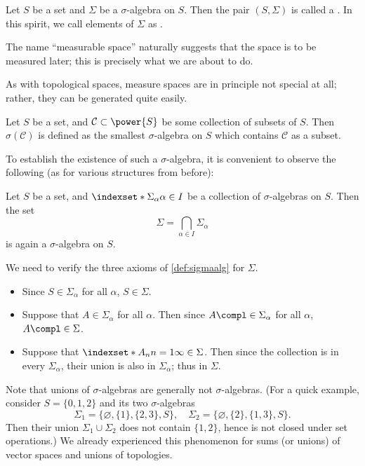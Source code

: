 \begin{definition}
    \label{def:mblspace}
    Let \(S\) be a set
    and \(\Sigma\) be a \(\sigma\)-algebra on \(S\).
    Then the pair \((S,\Sigma)\) is called
    a .
    In this spirit,
    we call elements of \(\Sigma\) as
    .
\end{definition}

The name ``measurable space'' naturally suggests that
the space is to be measured later;
this is precisely what we are about to do.

As with topological spaces,
measure spaces are in principle not special at all;
rather, they can be generated quite easily.

\begin{definition}
    \label{def:gensigmaalg}
    Let \(S\) be a set,
    and \(\mathcal C\subset\power{S}\) be some collection
    of subsets of \(S\).
    Then \(\sigma(\mathcal C)\) is defined as
    the smallest \(\sigma\)-algebra on \(S\)
    which contains \(\mathcal C\) as a subset.
\end{definition}

To establish the existence of such a \(\sigma\)-algebra,
it is convenient to observe the following
(as for various structures from before):
\begin{proposition}
    \label{prop:intersectsigma}
    Let \(S\) be a set,
    and \(\indexset*{\Sigma_\alpha}{\alpha\in I}{}\)
    be a collection of \(\sigma\)-algebras on \(S\).
    Then the set
    \[
        \Sigma
        =\bigcap_{\alpha\in I}\Sigma_\alpha
    \]
    is again a \(\sigma\)-algebra on \(S\).
\end{proposition}
\begin{myproof}
    We need to verify the three axioms of \cref{def:sigmaalg}
    for \(\Sigma\).
    \begin{itemize}
        \item Since \(S\in\Sigma_\alpha\) for all \(\alpha\),
        \(S\in\Sigma\).

        \item Suppose that \(A\in\Sigma_\alpha\) for all \(\alpha\).
        Then since \(A\compl\in\Sigma_\alpha\) for all \(\alpha\),
        \(A\compl\in\Sigma\).

        \item Suppose that \(\indexset*{A_n}{n=1}{\infty}\in\Sigma\).
        Then since the collection is in every \(\Sigma_\alpha\),
        their union is also in \(\Sigma_\alpha\);
        thus in \(\Sigma\).
        \rightqed
    \end{itemize}
\end{myproof}
Note that
unions of \(\sigma\)-algebras are generally not \(\sigma\)-algebras.
(For a quick example,
consider \(S=\{0,1,2\}\) and its two \(\sigma\)-algebras
\[
    \Sigma_1=\{\varnothing,\{1\},\{2,3\},S\},
    \quad
    \Sigma_2=\{\varnothing,\{2\},\{1,3\},S\}.
\]
Then their union \(\Sigma_1\cup\Sigma_2\) does not contain \(\{1,2\}\),
hence is not closed under set operations.)
We already experienced this phenomenon
for sums (or unions) of vector spaces and unions of topologies.

